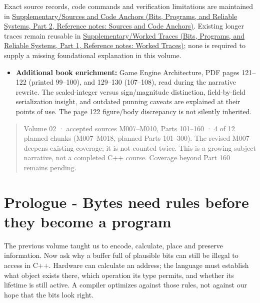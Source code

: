 Exact source records, code commands and verification limitations are maintained in \href{../01-Bits-Programs-and-Reliable-Systems-P02/main.pdf\#appendix-a103e7846d21}{Supplementary/Sources and Code Anchors (Bits, Programs, and Reliable Systems, Part 2, Reference notes: Sources and Code Anchors)}. Existing longer traces remain reusable in \href{../01-Bits-Programs-and-Reliable-Systems-P01/main.pdf\#appendix-92ff77d4dfdc}{Supplementary/Worked Traces (Bits, Programs, and Reliable Systems, Part 1, Reference notes: Worked Traces)}; none is required to supply a missing foundational explanation in this volume.

\begin{itemize}
\tightlist
\item
  \textbf{Additional book enrichment:} Game Engine Architecture, PDF pages 121--122 (printed 99--100), and 129--130 (107--108), read during the narrative rewrite. The scaled-integer versus sign/magnitude distinction, field-by-field serialization insight, and outdated punning caveats are explained at their points of use. The page 122 figure/body discrepancy is not silently inherited.
\end{itemize}

\begin{quote}
Volume 02 · accepted sources M007--M010, Parts 101--160 · 4 of 12 planned chunks (M007--M018, planned Parts 101--300). The revised M007 deepens existing coverage; it is not counted twice. This is a growing subject narrative, not a completed C++ course. Coverage beyond Part 160 remains pending.
\end{quote}

\section{Prologue - Bytes need rules before they become a program}\label{05-engine-i-ch002-prologue---bytes-need-rules-before-they-become-a-program}

\hypertarget{05-engine-i-ch002-prologue---bytes-need-rules-before-they-become-a-program}{}

The previous volume taught us to encode, calculate, place and preserve information. Now ask why a buffer full of plausible bits can still be illegal to access in C++. Hardware can calculate an address; the language must establish what object exists there, which operation its type permits, and whether its lifetime is still active. A compiler optimizes against those rules, not against our hope that the bits look right.


